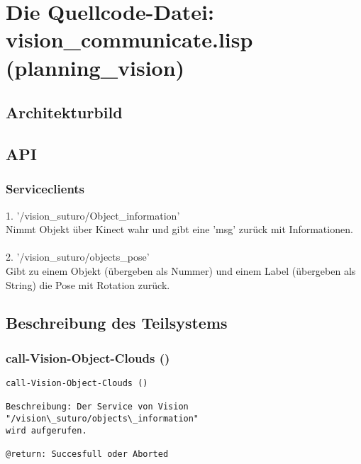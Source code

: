 \documentclass{suturo}
\begin{document}
\newpage
\section{Die Quellcode-Datei: vision\_communicate.lisp (planning\_vision)}

\subsection{Architekturbild}




\begin{figure}[!htb]
\end{figure}




\subsection{API}
\subsubsection{Serviceclients}
1. '/vision\_suturo/Object\_information' \\
Nimmt Objekt über Kinect wahr und gibt eine 'msg' zurück mit Informationen.\\ \\
2. '/vision\_suturo/objects\_pose' \\
Gibt zu einem Objekt (übergeben als Nummer) und einem Label (übergeben als String) die Pose mit Rotation zurück.

\subsection{Beschreibung des Teilsystems}




\subsubsection{call-Vision-Object-Clouds ()}
\begin{verbatim}
call-Vision-Object-Clouds ()

Beschreibung: Der Service von Vision "/vision\_suturo/objects\_information"
wird aufgerufen.

@return: Succesfull oder Aborted
\end{verbatim}
\end{document}
